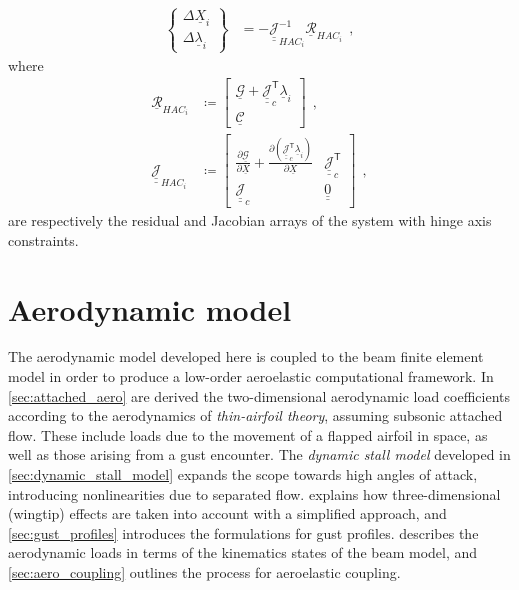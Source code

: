 \documentclass[12pt,a4paper,oneside,english]{abntex2} %
\newcommand{\vect}[1]{\underline{#1}}
\newcommand{\del}[2]{\frac{\partial#1}{\partial#2}}
\def\tens#1{\underline{\underline{#1}}}
\def\lp{\left(}
\def\rp{\right)}
\def\T{\mathsf{T}}
\def\Sys{\mathcal{\vect{G}}}
\def\X{\vect{X}}
\def\Xi{\X_i}
\def\JacSys{\tens{\mathcal{J}}}
\def\lambvi{\vect{\lambda}_i}
\begin{document}
\begin{align}
     \begin{Bmatrix} \Delta\Xi \\ \Delta\lambvi \end{Bmatrix} &= -\tens{\mathcal{J}}_{{HAC}_i}^{-1}\vect{\mathcal{R}}_{{HAC}_i} \ \ ,
    \label{eq:sys_constrained2}
\end{align}
where 
\begin{align}
    \vect{\mathcal{R}}_{{HAC}_i} &\coloneqq \begin{bmatrix} \Sys + \JacSys_c^\T \lambvi \\ \mathcal{\vect{C}} \end{bmatrix} \ \ ,
    \label{eq:Res_constrained}
    \\
    \tens{\mathcal{J}}_{{HAC}_i} &\coloneqq \begin{bmatrix} \del{\Sys}{\X} +  \del{\lp\JacSys_c^\T\lambvi\rp}{\X} & \JacSys_c^\T \\ \JacSys_c & \tens{0} \end{bmatrix} \ \ ,
    \label{eq:JacSys_constrained}
\end{align}
are respectively the residual and Jacobian arrays of the system with hinge axis constraints.

\chapter{Aerodynamic model}
\label{ch:aero_model}

The aerodynamic model developed here is coupled to the beam finite element model in order to produce a low-order aeroelastic computational framework. In \cref{sec:attached_aero} are derived the two-dimensional aerodynamic load coefficients according to the aerodynamics of \textit{thin-airfoil theory}, assuming subsonic attached flow. These include loads due to the movement of a flapped airfoil in space, as well as those arising from a gust encounter. The \textit{dynamic stall model} developed in \cref{sec:dynamic_stall_model} expands the scope towards high angles of attack, introducing nonlinearities due to separated flow.  explains how three-dimensional (wingtip) effects are taken into account with a simplified approach, and \cref{sec:gust_profiles} introduces the formulations for gust profiles.  describes the aerodynamic loads in terms of the kinematics states of the beam model, and \cref{sec:aero_coupling} outlines the process for aeroelastic coupling.
\end{document}
